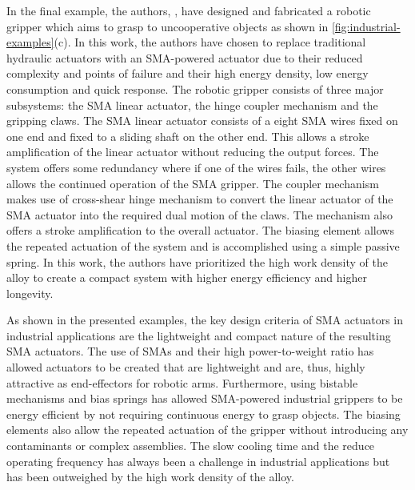 In the final example, the authors, \cite{luNovelDesignParallel2019}, have designed and fabricated a robotic gripper which aims to grasp to uncooperative objects as shown in \cref{fig:industrial-examples}(c). In this work, the authors have chosen to replace traditional hydraulic actuators with an SMA-powered actuator due to their reduced complexity and points of failure and their high energy density, low energy consumption and quick response. The robotic gripper consists of three major subsystems: the SMA linear actuator, the hinge coupler mechanism and the gripping claws. The SMA linear actuator consists of a eight SMA wires fixed on one end and fixed to a sliding shaft on the other end. This allows a stroke amplification of the linear actuator without reducing the output forces. The system offers some redundancy where if one of the wires fails, the other wires allows the continued operation of the SMA gripper. The coupler mechanism makes use of cross-shear hinge mechanism to convert the linear actuator of the SMA actuator into the required dual motion of the claws. The mechanism also offers a stroke amplification to the overall actuator. The biasing element allows the repeated actuation of the system and is accomplished using a simple passive spring. In this work, the authors have prioritized the high work density of the alloy to create a compact system with higher energy efficiency and higher longevity.

As shown in the presented examples, the key design criteria of SMA actuators in industrial applications are the lightweight and compact nature of the resulting SMA actuators. The use of SMAs and their high power-to-weight ratio has allowed actuators to be created that are lightweight and are, thus, highly attractive as end-effectors for robotic arms. Furthermore, using bistable mechanisms and bias springs has allowed SMA-powered industrial grippers to be energy efficient by not requiring continuous energy to grasp objects. The biasing elements also allow the repeated actuation of the gripper without introducing any contaminants or complex assemblies. The slow cooling time and the reduce operating frequency has always been a challenge in industrial applications but has been outweighed by the high work density of the alloy.

